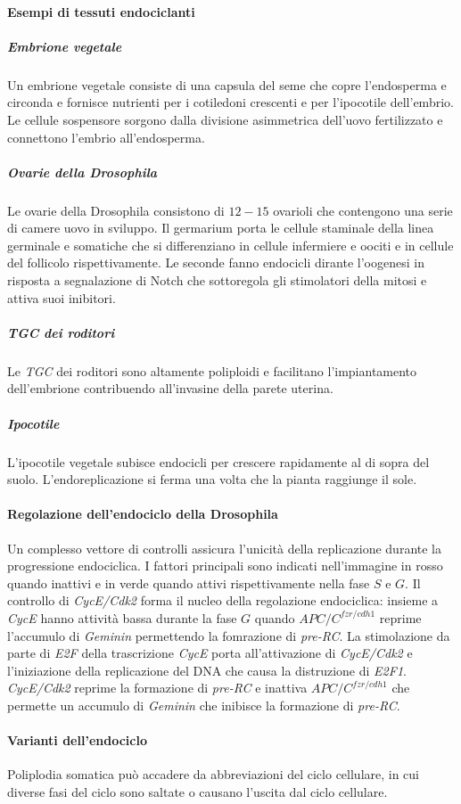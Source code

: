 \paragraph{Esempi di tessuti endociclanti}
\subparagraph{Embrione vegetale}
Un embrione vegetale consiste di una capsula del seme che copre l'endosperma e circonda e fornisce nutrienti per i cotiledoni crescenti e per l'ipocotile dell'embrio. Le cellule 
sospensore sorgono dalla divisione asimmetrica dell'uovo fertilizzato e connettono l'embrio all'endosperma.
\subparagraph{Ovarie della Drosophila}
Le ovarie della Drosophila consistono di $12-15$ ovarioli che contengono una serie di camere uovo in sviluppo. Il germarium porta le cellule staminale della linea germinale e somatiche 
che si differenziano in cellule infermiere e oociti e in cellule del follicolo rispettivamente. Le seconde fanno endocicli dirante l'oogenesi in risposta a segnalazione di Notch che 
sottoregola gli stimolatori della mitosi e attiva suoi inibitori. 
\subparagraph{\emph{TGC} dei roditori}
Le \emph{TGC} dei roditori sono altamente poliploidi e facilitano l'impiantamento dell'embrione contribuendo all'invasine della parete uterina. 
\subparagraph{Ipocotile}
L'ipocotile vegetale subisce endocicli per crescere rapidamente al di sopra del suolo. L'endoreplicazione si ferma una volta che la pianta raggiunge il sole. 
\paragraph{Regolazione dell'endociclo della Drosophila}
Un complesso vettore di controlli assicura l'unicit\`a della replicazione durante la progressione endociclica. I fattori principali sono indicati nell'immagine in rosso quando inattivi 
e in verde quando attivi rispettivamente nella fase $S$ e $G$. Il controllo di \emph{CycE/Cdk2} forma il nucleo della regolazione endociclica: insieme a \emph{CycE}  hanno attivit\`a
bassa durante la fase $G$ quando $APC/C^{fzr/cdh1}$ reprime l'accumulo di \emph{Geminin} permettendo la fomrazione di \emph{pre-RC}. La stimolazione da parte di \emph{E2F} della 
trascrizione \emph{CycE} porta all'attivazione di \emph{CycE/Cdk2} e l'iniziazione della replicazione del DNA che causa la distruzione di \emph{E2F1}. \emph{CycE/Cdk2} reprime la 
formazione di \emph{pre-RC} e inattiva $APC/C^{fzr/cdh1}$ che permette un accumulo di \emph{Geminin} che inibisce la formazione di \emph{pre-RC}. 
\paragraph{Varianti dell'endociclo}
Poliplodia somatica pu\`o accadere da abbreviazioni del ciclo cellulare, in cui diverse fasi del ciclo sono saltate o causano l'uscita dal ciclo cellulare. 
